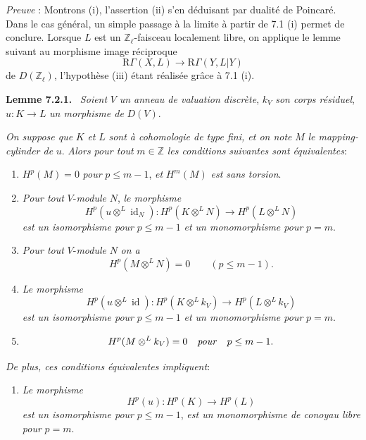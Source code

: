 \documentclass[11pt]{article}
\newenvironment{statement}[1]{\par\medskip\noindent\textbf{#1.}\ }{\par\medskip}
\newcommand{\R}{\mathrm{R}}\newcommand{\RHomCore}{\mathrm{RHom}}
\providecommand{\R}{\mathrm R}
\begin{document}
\emph{Preuve} : Montrons (i), l'assertion (ii) s'en déduisant par dualité de Poincaré. Dans le cas général, un simple passage à la limite à partir de 7.1 (i) permet de conclure. Lorsque $L$ est un $\mathbb Z_\ell$-faisceau localement libre, on applique le lemme suivant au morphisme image réciproque
\[
\R\Gamma(X,L)\to \R\Gamma(Y,L|Y)
\]
de $D(\mathbb Z_\ell)$, l'hypothèse (iii) étant réalisée grâce à 7.1 (i).

\begin{statement}{Lemme 7.2.1}
\emph{Soient} $V$ \emph{un anneau de valuation discrète}, $k_V$ \emph{son corps résiduel}, $u:K\to L$ \emph{un morphisme de} $D(V)$.

\emph{On suppose que} $K$ \emph{et} $L$ \emph{sont à cohomologie de type fini, et on note} $M$ \emph{le mapping-cylinder de} $u$. \emph{Alors pour tout} $m\in\mathbb Z$ \emph{les conditions suivantes sont équivalentes}:
\begin{enumerate}[label=(\roman*)]
\item $H^p(M)=0$ \emph{pour} $p\le m-1$, \emph{et} $H^m(M)$ \emph{est sans torsion}.
\item
\emph{Pour tout} $V$-\emph{module} $N$, \emph{le morphisme}
\[
H^p(u\otimes^L\operatorname{id}_N):H^p(K\otimes^L N)\to H^p(L\otimes^L N)
\]
\emph{est un isomorphisme pour} $p\le m-1$ \emph{et un monomorphisme pour} $p=m$.
\item[(ii bis)] \emph{Pour tout} $V$-\emph{module} $N$ \emph{on a}
\[
H^p(M\otimes^L N)=0\qquad(p\le m-1).
\]
\item \emph{Le morphisme}
\[
H^p(u\otimes^L\operatorname{id}):H^p(K\otimes^L k_V)\to H^p(L\otimes^L k_V)
\]
\emph{est un isomorphisme pour} $p\le m-1$ \emph{et un monomorphisme pour} $p=m$.
\item[(iii bis)]
\[
H^p(M\otimes^L k_V)=0\quad\text{\emph{pour}}\quad p\le m-1.
\]
\end{enumerate}
\emph{De plus, ces conditions équivalentes impliquent}:
\begin{enumerate}[label=(\roman* bis)]
\item \emph{Le morphisme}
\[
H^p(u):H^p(K)\to H^p(L)
\]
\emph{est un isomorphisme pour} $p\le m-1$, \emph{est un monomorphisme de conoyau libre pour} $p=m$.
\end{enumerate}
\end{statement}
\end{document}
